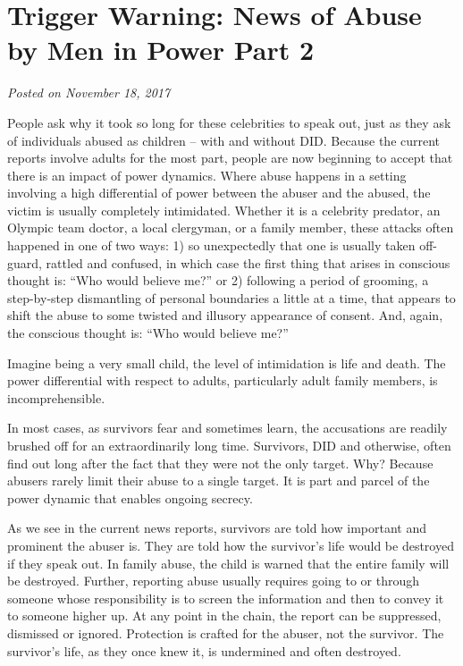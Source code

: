 \documentclass[]{book}
\begin{document}
\hypertarget{trigger-warning-news-of-abuse-by-men-in-power-part-2}{%
\section{Trigger Warning: News of Abuse by Men in Power Part 2}\label{trigger-warning-news-of-abuse-by-men-in-power-part-2}}

\emph{Posted on November 18, 2017}

People ask why it took so long for these celebrities to speak out, just as they ask of individuals abused as children -- with and without DID. Because the current reports involve adults for the most part, people are now beginning to accept that there is an impact of power dynamics. Where abuse happens in a setting involving a high differential of power between the abuser and the abused, the victim is usually completely intimidated. Whether it is a celebrity predator, an Olympic team doctor, a local clergyman, or a family member, these attacks often happened in one of two ways: 1) so unexpectedly that one is usually taken off-guard, rattled and confused, in which case the first thing that arises in conscious thought is: ``Who would believe me?'' or 2) following a period of grooming, a step-by-step dismantling of personal boundaries a little at a time, that appears to shift the abuse to some twisted and illusory appearance of consent. And, again, the conscious thought is: ``Who would believe me?''

Imagine being a very small child, the level of intimidation is life and death. The power differential with respect to adults, particularly adult family members, is incomprehensible.

In most cases, as survivors fear and sometimes learn, the accusations are readily brushed off for an extraordinarily long time. Survivors, DID and otherwise, often find out long after the fact that they were not the only target. Why? Because abusers rarely limit their abuse to a single target. It is part and parcel of the power dynamic that enables ongoing secrecy.

As we see in the current news reports, survivors are told how important and prominent the abuser is. They are told how the survivor's life would be destroyed if they speak out. In family abuse, the child is warned that the entire family will be destroyed. Further, reporting abuse usually requires going to or through someone whose responsibility is to screen the information and then to convey it to someone higher up. At any point in the chain, the report can be suppressed, dismissed or ignored. Protection is crafted for the abuser, not the survivor. The survivor's life, as they once knew it, is undermined and often destroyed.
\end{document}
